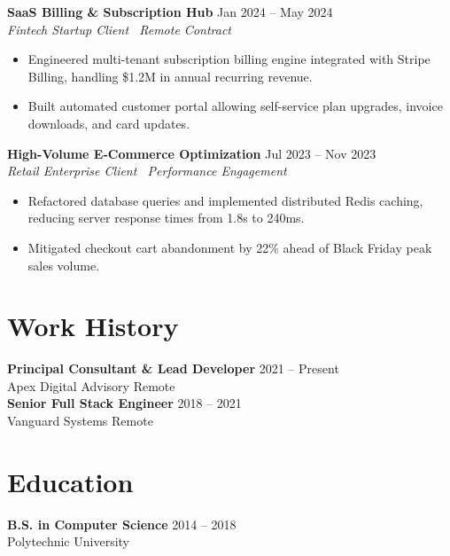 \documentclass[10pt,a4paper]{article}
\begin{document}
\vspace{3pt}
\textbf{SaaS Billing \& Subscription Hub} \hfill Jan 2024 -- May 2024\\
\textit{Fintech Startup Client \textbar\ Remote Contract}
\begin{itemize}
    \item Engineered multi-tenant subscription billing engine integrated with Stripe Billing, handling \$1.2M in annual recurring revenue.
    \item Built automated customer portal allowing self-service plan upgrades, invoice downloads, and card updates.
\end{itemize}

\vspace{3pt}
\textbf{High-Volume E-Commerce Optimization} \hfill Jul 2023 -- Nov 2023\\
\textit{Retail Enterprise Client \textbar\ Performance Engagement}
\begin{itemize}
    \item Refactored database queries and implemented distributed Redis caching, reducing server response times from 1.8s to 240ms.
    \item Mitigated checkout cart abandonment by 22\% ahead of Black Friday peak sales volume.
\end{itemize}

\section{Work History}
\textbf{Principal Consultant \& Lead Developer} \hfill 2021 -- Present\\
Apex Digital Advisory \hfill Remote\\
\textbf{Senior Full Stack Engineer} \hfill 2018 -- 2021\\
Vanguard Systems \hfill Remote

\section{Education}
\textbf{B.S. in Computer Science} \hfill 2014 -- 2018\\
Polytechnic University
\end{document}
